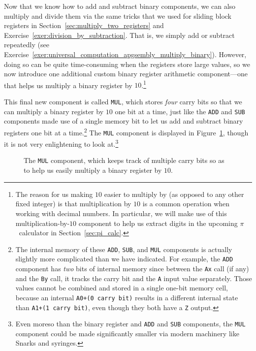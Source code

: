 Now that we know how to add and subtract binary components, we can also multiply and divide them via the same tricks that we used for sliding block registers in Section~\ref{sec:multiply_two_registers} and Exercise~\ref{exer:division_by_subtraction}. That is, we simply add or subtract repeatedly (see Exercise~\ref{exer:universal_computation_apgsembly_multiply_binary}). However, doing so can be quite time-consuming when the registers store large values, so we now introduce one additional  custom binary register arithmetic component---one that helps us multiply a binary register by $10$.\footnote{The reason for us making $10$ easier to multiply by (as opposed to any other fixed integer) is that multiplication by $10$ is a common operation when working with decimal numbers. In particular, we will make use of this multiplication-by-$10$ component to help us extract digits in the upcoming $\pi$~calculator in Section~\ref{sec:pi_calc}.}

This final new component is called \texttt{MUL}, which stores \emph{four} carry bits so that we can multiply a binary register by $10$ one bit at a time, just like the \texttt{ADD} and \texttt{SUB} components made use of a single memory bit to let us add and subtract binary registers one bit at a time.\footnote{The internal memory of these \texttt{ADD}, \texttt{SUB}, and \texttt{MUL} components is actually slightly more complicated than we have indicated. For example, the \texttt{ADD} component has \emph{two} bits of internal memory since between the \texttt{Ax} call (if any) and the \texttt{By} call, it tracks the carry bit and the \texttt{A} input value separately. Those values cannot be combined and stored in a single one-bit memory cell, because an internal \texttt{A0+(0 carry bit)} results in a different internal state than \texttt{A1+(1 carry bit)}, even though they both have a \texttt{Z} output.} The \texttt{MUL} component is displayed in Figure~\ref{fig:mul_component}, though it is not very enlightening to look at.\footnote{Even moreso than the binary register and \texttt{ADD} and \texttt{SUB} components, the \texttt{MUL} component could be made significantly smaller via modern machinery like Snarks and syringes.}

\begin{figure}[!htb]
	\centering
	\caption{The \texttt{MUL} component, which keeps track of multiple carry bits so as to help us easily multiply a binary register by $10$.}\label{fig:mul_component}
\end{figure}

